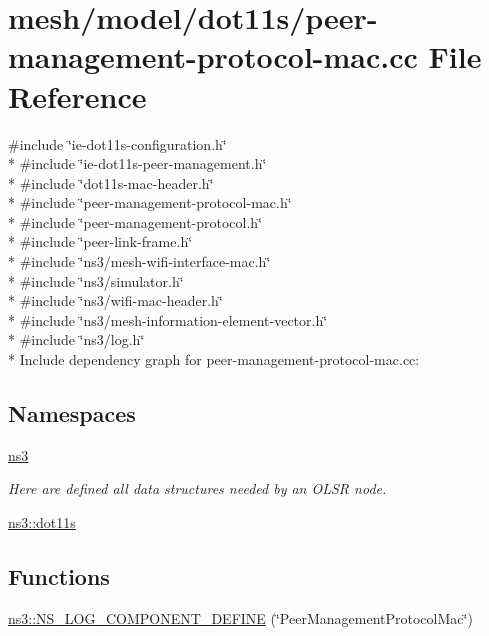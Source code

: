 \hypertarget{peer-management-protocol-mac_8cc}{}\section{mesh/model/dot11s/peer-\/management-\/protocol-\/mac.cc File Reference}
\label{peer-management-protocol-mac_8cc}
{\ttfamily \#include \char`\"{}ie-\/dot11s-\/configuration.\+h\char`\"{}}\\*
{\ttfamily \#include \char`\"{}ie-\/dot11s-\/peer-\/management.\+h\char`\"{}}\\*
{\ttfamily \#include \char`\"{}dot11s-\/mac-\/header.\+h\char`\"{}}\\*
{\ttfamily \#include \char`\"{}peer-\/management-\/protocol-\/mac.\+h\char`\"{}}\\*
{\ttfamily \#include \char`\"{}peer-\/management-\/protocol.\+h\char`\"{}}\\*
{\ttfamily \#include \char`\"{}peer-\/link-\/frame.\+h\char`\"{}}\\*
{\ttfamily \#include \char`\"{}ns3/mesh-\/wifi-\/interface-\/mac.\+h\char`\"{}}\\*
{\ttfamily \#include \char`\"{}ns3/simulator.\+h\char`\"{}}\\*
{\ttfamily \#include \char`\"{}ns3/wifi-\/mac-\/header.\+h\char`\"{}}\\*
{\ttfamily \#include \char`\"{}ns3/mesh-\/information-\/element-\/vector.\+h\char`\"{}}\\*
{\ttfamily \#include \char`\"{}ns3/log.\+h\char`\"{}}\\*
Include dependency graph for peer-\/management-\/protocol-\/mac.cc\+:
\subsection*{Namespaces}
\begin{DoxyCompactItemize}
\item 
 \hyperlink{namespacens3}{ns3}
\begin{DoxyCompactList}\small\item\em Here are defined all data structures needed by an O\+L\+SR node. \end{DoxyCompactList}\item 
 \hyperlink{namespacens3_1_1dot11s}{ns3\+::dot11s}
\end{DoxyCompactItemize}
\subsection*{Functions}
\begin{DoxyCompactItemize}
\item 
\hyperlink{namespacens3_a9ef51b40a687ce2357044dc6e374be94}{ns3\+::\+N\+S\+\_\+\+L\+O\+G\+\_\+\+C\+O\+M\+P\+O\+N\+E\+N\+T\+\_\+\+D\+E\+F\+I\+NE} (\char`\"{}Peer\+Management\+Protocol\+Mac\char`\"{})
\end{DoxyCompactItemize}
